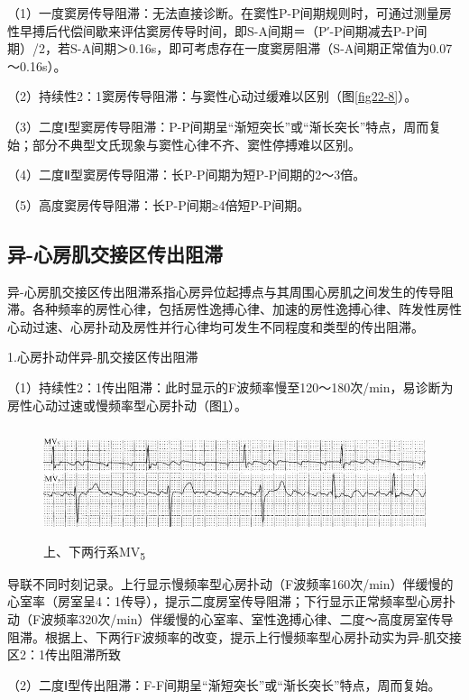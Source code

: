 （1）一度窦房传导阻滞：无法直接诊断。在窦性P-P间期规则时，可通过测量房性早搏后代偿间歇来评估窦房传导时间，即S-A间期＝（P′-P间期减去P-P间期）/2，若S-A间期＞0.16s，即可考虑存在一度窦房阻滞（S-A间期正常值为0.07～0.16s）。

（2）持续性2：1窦房传导阻滞：与窦性心动过缓难以区别（图\ref{fig22-8}）。

（3）二度Ⅰ型窦房传导阻滞：P-P间期呈“渐短突长”或“渐长突长”特点，周而复始；部分不典型文氏现象与窦性心律不齐、窦性停搏难以区别。

（4）二度Ⅱ型窦房传导阻滞：长P-P间期为短P-P间期的2～3倍。

（5）高度窦房传导阻滞：长P-P间期≥4倍短P-P间期。

\protect\hypertarget{text00030.htmlux5cux23subid361}{}{}

\subsection{异-心房肌交接区传出阻滞}

异-心房肌交接区传出阻滞系指心房异位起搏点与其周围心房肌之间发生的传导阻滞。各种频率的房性心律，包括房性逸搏心律、加速的房性逸搏心律、阵发性房性心动过速、心房扑动及房性并行心律均可发生不同程度和类型的传出阻滞。

1.心房扑动伴异-肌交接区传出阻滞

（1）持续性2：1传出阻滞：此时显示的F波频率慢至120～180次/min，易诊断为房性心动过速或慢频率型心房扑动（图\ref{fig23-1}）。

\begin{figure}[!htbp]
 \centering
 \includegraphics[width=5.58333in,height=1.29167in]{./images/Image00385.jpg}
 \captionsetup{justification=centering}
 \caption{上、下两行系MV\textsubscript{5}}
 \label{fig23-1}
  \end{figure} 
导联不同时刻记录。上行显示慢频率型心房扑动（F波频率160次/min）伴缓慢的心室率（房室呈4：1传导），提示二度房室传导阻滞；下行显示正常频率型心房扑动（F波频率320次/min）伴缓慢的心室率、室性逸搏心律、二度～高度房室传导阻滞。根据上、下两行F波频率的改变，提示上行慢频率型心房扑动实为异-肌交接区2：1传出阻滞所致

（2）二度Ⅰ型传出阻滞：F-F间期呈“渐短突长”或“渐长突长”特点，周而复始。

